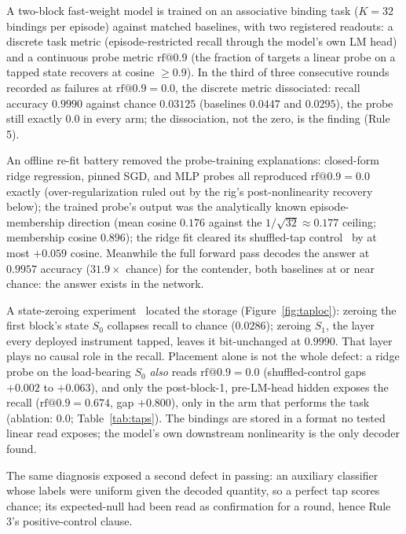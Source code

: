 \documentclass{article}
\makeatletter
\newcommand{\rf}{\mathrm{rf}@0.9}
\makeatother
\begin{document}
 A two-block fast-weight model is trained on an associative binding
task ($K=32$ bindings per episode) against matched baselines, with two
registered readouts: a discrete task metric (episode-restricted recall
through the model's own LM head) and a continuous
probe metric $\rf$ (the fraction of targets a linear probe on a
tapped state recovers at cosine $\geq0.9$). In the third of three
consecutive rounds recorded as failures at $\rf=0.0$, the discrete
metric dissociated: recall accuracy $0.9990$ against chance $0.03125$
(baselines $0.0447$ and $0.0295$), the probe still exactly $0.0$ in
every arm; the dissociation, not the zero, is the finding (Rule 5).

 An offline re-fit battery removed the probe-training explanations:
closed-form ridge regression, pinned SGD, and MLP probes all
reproduced $\rf=0.0$ exactly (over-regularization ruled out by the
rig's post-nonlinearity recovery below); the trained probe's
output was the analytically known
episode-membership direction (mean cosine $0.176$ against the
$1/\sqrt{32}\approx0.177$ ceiling; membership cosine $0.896$); the
ridge fit cleared its shuffled-tap control~\citep{hewitt2019control}
by at most $+0.059$
cosine.
Meanwhile the full forward pass decodes the answer at $0.9957$
accuracy ($31.9\times$ chance) for the contender, both baselines at or
near chance: the answer exists in the network.

 A state-zeroing experiment~\citep{elazar2021amnesic} located the
storage
(Figure~\ref{fig:taploc}): zeroing the
first block's state $S_0$ collapses recall to chance ($0.0286$);
zeroing $S_1$, the layer every deployed instrument tapped, leaves it
bit-unchanged at $0.9990$. That layer plays no causal role in the
recall.
Placement alone is not the whole defect: a ridge
probe on the load-bearing $S_0$ \emph{also} reads $\rf=0.0$
(shuffled-control gaps $+0.002$ to $+0.063$),
and only the post-block-1, pre-LM-head hidden exposes the recall
($\rf=0.674$, gap $+0.800$), only in the arm that performs
the task (ablation: $0.0$; Table~\ref{tab:taps}).
The bindings are stored in a format no tested linear read exposes;
the model's own downstream nonlinearity is the only decoder found.

The same diagnosis exposed a second defect in passing: an auxiliary
classifier whose labels were uniform given the decoded quantity, so a
perfect tap scores chance; its expected-null had been read as
confirmation for a round, hence Rule 3's positive-control clause.
\end{document}
